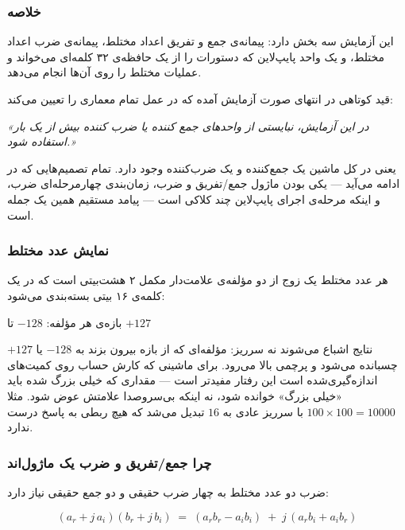 \documentclass[10pt,a4paper]{article}
\begin{document}

\subsubsection*{خلاصه}

این آزمایش سه بخش دارد: پیمانه‌ی جمع و تفریق اعداد مختلط، پیمانه‌ی ضرب اعداد مختلط، و یک واحد پایپ‌لاین که دستورات را از یک حافظه‌ی ۳۲ کلمه‌ای می‌خواند و عملیات مختلط را روی آن‌ها انجام می‌دهد.

قید کوتاهی در انتهای صورت آزمایش آمده که در عمل تمام معماری را تعیین می‌کند:

\begin{center}
\emph{«در این آزمایش، نبایستی از واحدهای جمع کننده یا ضرب کننده بیش از یک بار استفاده شود.»}
\end{center}

یعنی در کل ماشین {یک} جمع‌کننده و {یک} ضرب‌کننده وجود دارد. تمام تصمیم‌هایی که در ادامه می‌آید — یکی بودن ماژول جمع/تفریق و ضرب، زمان‌بندی چهارمرحله‌ای ضرب، و اینکه مرحله‌ی اجرای پایپ‌لاین چند کلاکی است — پیامد مستقیم همین یک جمله است.

\subsubsection*{نمایش عدد مختلط}

هر عدد مختلط یک زوج از دو مؤلفه‌ی {علامت‌دار مکمل ۲} هشت‌بیتی است که در یک کلمه‌ی ۱۶ بیتی بسته‌بندی می‌شود:

\begin{center}
 \qquad بازه‌ی هر مؤلفه: $-128$ تا $+127$
\end{center}

نتایج {اشباع} می‌شوند نه سرریز: مؤلفه‌ای که از بازه بیرون بزند به $-128$ یا $+127$ چسبانده می‌شود و پرچمی بالا می‌رود. برای ماشینی که کارش حساب روی کمیت‌های اندازه‌گیری‌شده است این رفتار مفیدتر است — مقداری که خیلی بزرگ شده باید «خیلی بزرگ» خوانده شود، نه اینکه بی‌سروصدا علامتش عوض شود. مثلا $100 \times 100 = 10000$ با سرریز عادی به $16$ تبدیل می‌شد که هیچ ربطی به پاسخ درست ندارد.

\subsubsection*{چرا جمع/تفریق و ضرب یک ماژول‌اند}

ضرب دو عدد مختلط به {چهار} ضرب حقیقی و {دو} جمع حقیقی نیاز دارد:

\[
(a_r + j\,a_i)(b_r + j\,b_i) \;=\; (a_r b_r - a_i b_i) \;+\; j\,(a_r b_i + a_i b_r)
\]
\end{document}
